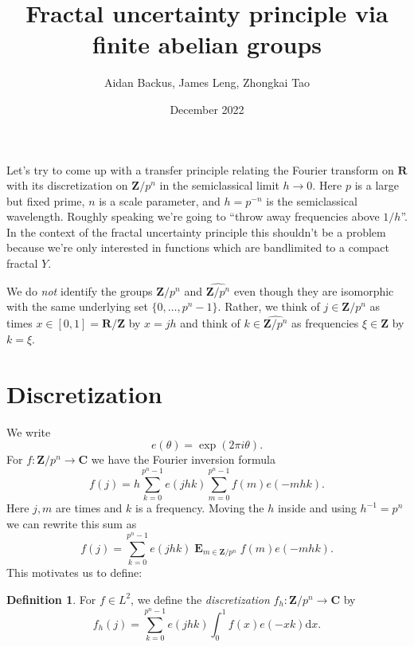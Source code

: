 \documentclass[reqno,12pt,letterpaper]{amsart}
\title{Fractal uncertainty principle via finite abelian groups}
\author{Aidan Backus, James Leng, Zhongkai Tao}
\date{December 2022}
\newcommand{\ZZ}{\mathbf{Z}}
\newcommand{\RR}{\mathbf{R}}
\newcommand{\CC}{\mathbf{C}}
\DeclareMathOperator*{\Expect}{\mathbf E}
\newcommand{\dif}{\mathrm d}
\newcommand{\dfn}[1]{\emph{#1}\index{#1}}
\theoremstyle{definition}
\newtheorem{definition}[theorem]{Definition}
\numberwithin{equation}{section}
\begin{document}

\maketitle


Let's try to come up with a transfer principle relating the Fourier transform on $\RR$ with its discretization on $\ZZ/p^n$ in the semiclassical limit $h \to 0$.
Here $p$ is a large but fixed prime, $n$ is a scale parameter, and $h = p^{-n}$ is the semiclassical wavelength.
Roughly speaking we're going to ``throw away frequencies above $1/h$''. In the context of the fractal uncertainty principle this shouldn't be a problem because we're only interested in functions which are bandlimited to a compact fractal $Y$.

We do \emph{not} identify the groups $\ZZ/p^n$ and $\widehat{\ZZ/p^n}$ even though they are isomorphic with the same underlying set $\{0, \dots, p^n - 1\}$.
Rather, we think of $j \in \ZZ/p^n$ as times $x \in [0, 1] = \RR/\ZZ$ by $x = jh$ and think of $k \in \widehat{\ZZ/p^n}$ as frequencies $\xi \in \ZZ$ by $k = \xi$.

\section{Discretization}
We write 
$$e(\theta) = \exp(2\pi i\theta).$$
For $f: \ZZ/p^n \to \CC$ we have the Fourier inversion formula 
$$f(j) = h \sum_{k=0}^{p^n - 1} e(jhk) \sum_{m=0}^{p^n - 1} f(m) e(-mhk).$$
Here $j, m$ are times and $k$ is a frequency. Moving the $h$ inside and using $h^{-1} = p^n$ we can rewrite this sum as 
$$f(j) = \sum_{k=0}^{p^n - 1} e(jhk) \Expect_{m \in \ZZ/p^n} f(m) e(-mhk).$$
This motivates us to define:

\begin{definition}
For $f \in L^2$, we define the \dfn{discretization} $f_h: \ZZ/p^n \to \CC$ by
$$f_h(j) = \sum_{k=0}^{p^n - 1} e(jhk) \int_0^1 f(x) e(-xk) \dif x.$$
\end{definition}
\end{document}

